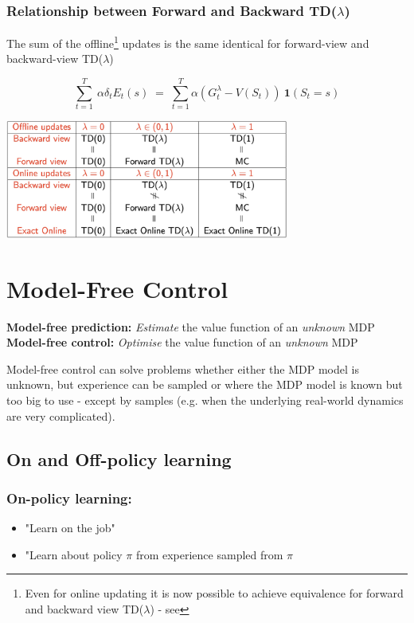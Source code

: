 \documentclass[10pt]{article}
\begin{document}
\subsubsection*{Relationship between Forward and Backward TD($\lambda$)}

The sum of the offline\footnote{Even for online updating it is now possible to achieve equivalence for forward and backward view TD($\lambda$) - see } updates is the same identical for forward-view and backward-view TD($\lambda$)

\begin{equation}
\sum_{t=1}^{T}\:\alpha \delta_{t} E_{t}(s)\;=\;\sum_{t=1}^{T}\alpha (G_{t}^{\lambda} - V(S_{t})) \: \mathbf{1}(S_{t} =s)
\end{equation}
\begin{center}
\includegraphics[width=0.7\textwidth]{pictures/overview_tdl.jpg}
\end{center}

\section{Model-Free Control}
\begin{center}
\textbf{Model-free prediction:} \textit{Estimate} the value function of an \textit{unknown} MDP
\textbf{Model-free control:} \textit{Optimise} the value function of an \textit{unknown} MDP
\end{center}


Model-free control can solve problems whether either the MDP model is unknown, but experience can be sampled or where the MDP model is known but too big to use - except by samples (e.g. when the underlying real-world dynamics are very complicated).

\subsection{On and Off-policy learning}
\subsubsection*{On-policy learning:}
\begin{itemize}
\item "Learn on the job"
\item "Learn about policy $\pi$ from experience sampled from $\pi$
\end{itemize}
\end{document}
